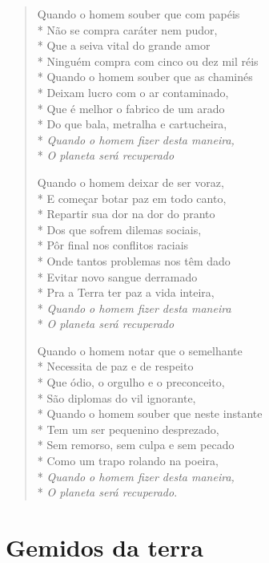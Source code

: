 \begin{verse}
Quando o homem souber que com papéis\\*
Não se compra caráter nem pudor,\\*
Que a seiva vital do grande amor\\*
Ninguém compra com cinco ou dez mil réis\\*
Quando o homem souber que as chaminés\\*
Deixam lucro com o ar contaminado,\\*
Que é melhor o fabrico de um arado\\*
Do que bala, metralha e cartucheira,\\*
\textit{Quando o homem fizer desta maneira,}\\*
\textit{O planeta será recuperado}

Quando o homem deixar de ser voraz,\\*
E começar botar paz em todo canto,\\*
Repartir sua dor na dor do pranto\\*
Dos que sofrem dilemas sociais,\\*
Pôr final nos conflitos raciais\\*
Onde tantos problemas nos têm dado\\*
Evitar novo sangue derramado\\*
Pra a Terra ter paz a vida inteira,\\*
\textit{Quando o homem fizer desta maneira}\\*
\textit{O planeta será recuperado}

Quando o homem notar que o semelhante\\*
Necessita de paz e de respeito\\*
Que ódio, o orgulho e o preconceito,\\*
São diplomas do vil ignorante,\\*
Quando o homem souber que neste instante\\*
Tem um ser pequenino desprezado,\\*
Sem remorso, sem culpa e sem pecado\\*
Como um trapo rolando na poeira,\\*
\textit{Quando o homem fizer desta maneira,}\\*
\textit{O planeta será recuperado}.
\end{verse}


\chapter{Gemidos da terra}

